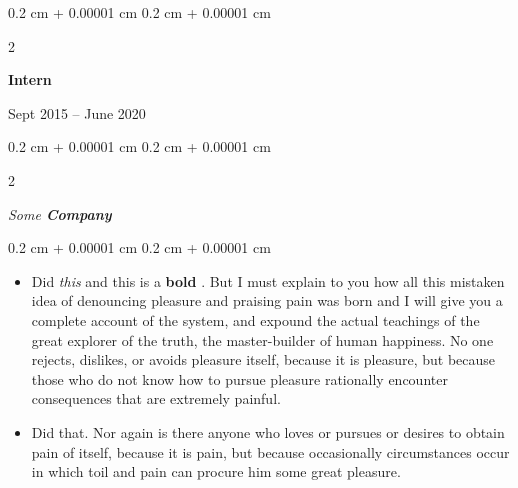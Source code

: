 \documentclass[10pt, letterpaper]{article}
\newenvironment{highlights}{
    \begin{itemize}[
        topsep=0.10 cm,
        parsep=0.10 cm,
        partopsep=0pt,
        itemsep=0pt,
        leftmargin=0.4 cm + 10pt
    ]
}{
    \end{itemize}
} %
\newenvironment{onecolentry}{
    \begin{adjustwidth}{
        0.2 cm + 0.00001 cm
    }{
        0.2 cm + 0.00001 cm
    }
}{
    \end{adjustwidth}
} %
\newenvironment{twocolentry}[2][]{
    \onecolentry
    \def\secondColumn{#2}
    \setcolumnwidth{\fill, 4.5 cm}
    \begin{paracol}{2}
}{
    \switchcolumn \raggedleft \secondColumn
    \end{paracol}
    \endonecolentry
} %
\let\hrefWithoutArrow\href
\renewcommand{\href}[2]{\hrefWithoutArrow{#1}{\ifthenelse{\equal{#2}{}}{ }{#2 }\raisebox{.15ex}{\footnotesize \faExternalLink*}}}
\begin{document}
        \vspace{0.2 cm}

                \begin{twocolentry}{
                    Sept 2015 – June 2020
                }
                \textbf{Intern}
                \end{twocolentry}
            \begin{twocolentry}{
            }
            \textit{Some \textbf{Company}}
            \end{twocolentry}

        \vspace{0.10 cm}
        \begin{onecolentry}
            \begin{highlights}
                \item Did \textit{this} and this is a \textbf{bold} \href{https://example.com}{link}. But I must explain to you how all this mistaken idea of denouncing pleasure and praising pain was born and I will give you a complete account of the system, and expound the actual teachings of the great explorer of the truth, the master-builder of human happiness. No one rejects, dislikes, or avoids pleasure itself, because it is pleasure, but because those who do not know how to pursue pleasure rationally encounter consequences that are extremely painful.
                \item Did that. Nor again is there anyone who loves or pursues or desires to obtain pain of itself, because it is pain, but because occasionally circumstances occur in which toil and pain can procure him some great pleasure.
            \end{highlights}
        \end{onecolentry}


        \vspace{0.2 cm}
\end{document}
